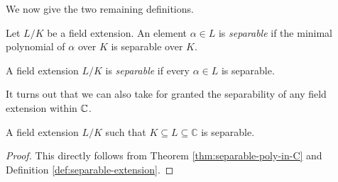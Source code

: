 We now give the two remaining definitions.


\begin{definition}
    Let $L/K$ be a field extension. An element $\alpha \in L$ is \textit{separable} if the minimal polynomial of $\alpha$ over $K$ is separable over $K$.
\end{definition}

\begin{definition} \label{def:separable-extension}
    A field extension $L / K$ is \textit{separable} if every $\alpha \in L$ is separable.
\end{definition}

It turns out that we can also take for granted the separability of any field extension within $\mathbb C$.

\begin{theorem} \label{thm:separable-extension-in-C}
    A field extension $L/K$ such that $K \subseteq L \subseteq \mathbb C$ is separable. 
\end{theorem}

\begin{proof}
    This directly follows from Theorem \ref{thm:separable-poly-in-C} and Definition \ref{def:separable-extension}. 
\end{proof}
